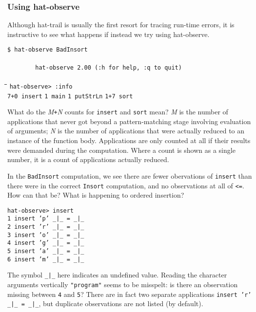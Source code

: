 \documentclass[12pt]{article}
\newcommand{\mkblue}[1]{#1}
\begin{document}
\subsubsection*{Using hat-observe}

Although hat-trail is usually the first resort for tracing run-time
errors, it is instructive to see what happens if instead we try
using hat-observe.
\begin{tabbing}
{\tt \$ hat-observe BadInsort } \\ \\
{\tt \ \ \ \ \ \ \ \ hat-observe 2.00  (:h for help, :q to quit)} \\ \\
\hspace{2.5cm}\=\hspace{2.5cm}\=\hspace{2.5cm}\=\hspace{2.5cm}\=\kill
{\tt hat-observe> :info } \\
{\tt 7+0 insert} \> {\tt 1 main} \> {\tt 1 putStrLn} \> {\tt 1+7 sort}
\end{tabbing}
What do the {\it M}{\tt +}{\it N} counts for {\tt insert} and {\tt sort}
mean?  {\it M} is the number of applications that never got
beyond a pattern-matching stage involving evaluation of arguments;
{\it N} is the number of applications that were actually reduced
to an instance of the function body.
Applications are only counted at all if their results were
demanded during the computation.
Where a count is shown as a single number, it is a count of applications
actually reduced.

In the {\tt BadInsort} computation, we see 
there are fewer obervations of {\tt insert} than there were
in the correct {\tt Insort}
computation, and no observations at all
of {\tt <=}.  How can that be?  What is happening
to ordered insertion?
\begin{tabbing}
{\tt hat-observe> insert }\\
{\tt \mkblue{1} insert 'p' \verb"_|_" = \verb"_|_" }\\
{\tt \mkblue{2} insert 'r' \verb"_|_" = \verb"_|_" }\\
{\tt \mkblue{3} insert 'o' \verb"_|_" = \verb"_|_" }\\
{\tt \mkblue{4} insert 'g' \verb"_|_" = \verb"_|_" }\\
{\tt \mkblue{5} insert 'a' \verb"_|_" = \verb"_|_" }\\
{\tt \mkblue{6} insert 'm' \verb"_|_" = \verb"_|_" }
\end{tabbing}
The symbol \verb"_|_" here indicates an undefined value.  Reading the character
arguments vertically {\tt "program"} seems to be misspelt: is there an observation
missing between {\tt 4} and {\tt 5}?  There are in fact two separate applications
{\tt insert 'r' \verb"_|_" = \verb"_|_"}, but duplicate observations are not listed (by default).
\end{document}
